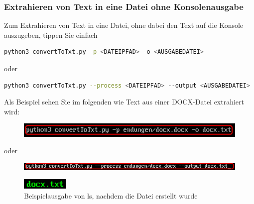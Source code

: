 \documentclass[12pt]{scrartcl}
\begin{document}
\subsubsection{Extrahieren von Text in eine Datei ohne Konsolenausgabe}
\label{sec:first-steps-extraction-file-without}
Zum Extrahieren von Text in eine Datei, ohne dabei den Text auf die Konsole auszugeben, tippen Sie einfach 
\begin{lstlisting}[language=bash]
python3 convertToTxt.py -p <DATEIPFAD> -o <AUSGABEDATEI>
\end{lstlisting}
\begin{center}
oder
\end{center}
\begin{lstlisting}[language=bash]
python3 convertToTxt.py --process <DATEIPFAD> --output <AUSGABEDATEI>
\end{lstlisting} 
Als Beispiel sehen Sie im folgenden wie Text aus einer DOCX-Datei extrahiert wird:
\begin{figure}[htbp]
\includegraphics[width=1.0\textwidth]{ersteSchritteExtractIntoFileWithoutConsole001}\par\vspace{0.25cm}
\label{fig:ersteSchritteExtractIntoFileWithoutConsole001}
\end{figure}
\begin{center}
oder
\end{center}
\begin{figure}[htbp]
\includegraphics[width=1.0\textwidth]{ersteSchritteExtractIntoFileWithoutConsole002}\par

\vspace{0.25cm}
\label{fig:ersteSchritteExtractIntoFileWithoutConsole002}
\end{figure}
\begin{figure}[htbp]
\centering
\includegraphics[width=0.2\textwidth]{ersteSchritteExtractIntoFileWithoutConsole003}\par\vspace{0.25cm}
\caption{Beispielausgabe von ls, nachdem die Datei erstellt wurde}
\label{fig:ersteSchritteExtractIntoFileWithoutConsole003}
\end{figure}
\newpage
\end{document}
